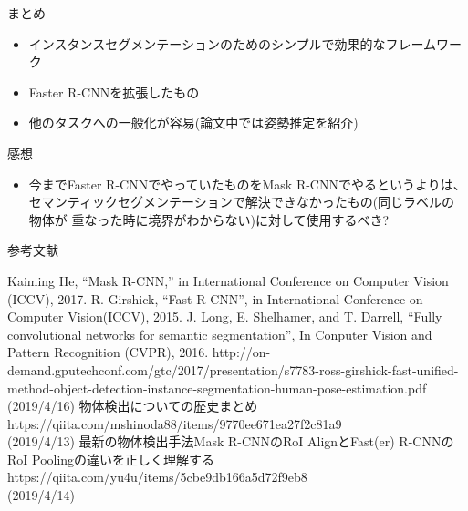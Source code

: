 \documentclass[aspectratio=169, dvipdfmx, 11pt]{beamer}
\begin{document}
\begin{frame}{まとめ}
    \begin{itemize}
        \item インスタンスセグメンテーションのためのシンプルで効果的なフレームワーク \\
        \item Faster R-CNNを拡張したもの
        \item 他のタスクへの一般化が容易(論文中では姿勢推定を紹介) \\
    \end{itemize}
\end{frame}

\begin{frame}{感想}
    \begin{itemize}
        \item 今までFaster R-CNNでやっていたものをMask R-CNNでやるというよりは、
        セマンティックセグメンテーションで解決できなかったもの(同じラベルの物体が
        重なった時に境界がわからない)に対して使用するべき? \\
    \end{itemize}
\end{frame}

\begin{frame}[allowframebreaks]{参考文献}
	\begin{thebibliography}{50}
    	 Kaiming He, “Mask R-CNN,” in International Conference on Computer Vision (ICCV), 2017.
    	 R. Girshick, “Fast R-CNN”, in International Conference on Computer Vision(ICCV), 2015.
    	 J. Long, E. Shelhamer, and T. Darrell, “Fully convolutional networks for semantic segmentation”, In Conputer Vision and Pattern Recognition (CVPR), 2016.
    	 http://on-demand.gputechconf.com/gtc/2017/presentation/s7783-ross-girshick-fast-unified-method-object-detection-instance-segmentation-human-pose-estimation.pdf (2019/4/16)
    	 物体検出についての歴史まとめ \\
        https://qiita.com/mshinoda88/items/9770ee671ea27f2c81a9 \\
        (2019/4/13)
         最新の物体検出手法Mask R-CNNのRoI AlignとFast(er) R-CNNのRoI Poolingの違いを正しく理解する \\
        https://qiita.com/yu4u/items/5cbe9db166a5d72f9eb8 \\
        (2019/4/14)
    \end{thebibliography}
\end{frame}
\end{document}
